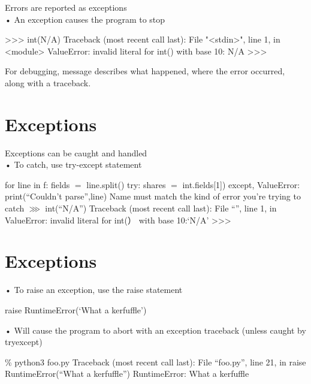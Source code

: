 \documentclass[
  letterpaper,
  DIV=11,
  numbers=noendperiod]{scrreprt}
\newenvironment{Shaded}{\begin{snugshade}}{\end{snugshade}}
\newcommand{\NormalTok}[1]{\textcolor[rgb]{0.00,0.23,0.31}{#1}}
\begin{document}
Errors are reported as exceptions\\
• An exception causes the program to stop

\begin{Shaded}
\begin{Highlighting}[]
\NormalTok{\textgreater{}\textgreater{}\textgreater{} int(\textquotesingle{}N/A\textquotesingle{})}
\NormalTok{Traceback (most recent call last):}
\NormalTok{    File "\textless{}stdin\textgreater{}", line 1, in \textless{}module\textgreater{}}
\NormalTok{ValueError: invalid literal for int() with base 10: \textquotesingle{}N/A\textquotesingle{}}
\NormalTok{\textgreater{}\textgreater{}\textgreater{} }
\end{Highlighting}
\end{Shaded}

For debugging, message describes what happened, where the error
occurred, along with a traceback.


\chapter{Exceptions}\label{exceptions}

Exceptions can be caught and handled\\
• To catch, use try-except statement

for line in f: fields \(=\) line.split() try: shares \(=\)
int.fields{[}1{]}) except, ValueError: print(``Couldn't parse'',line)
Name must match the kind of error you're trying to catch \(\ggg\)
int(``N/A'') Traceback (most recent call last): File ``'', line 1, in
ValueError: invalid literal for int(） with base 10:`N/A'
\textgreater\textgreater\textgreater{}


\chapter{Exceptions}\label{exceptions-1}

• To raise an exception, use the raise statement

raise RuntimeError(`What a kerfuffle')

• Will cause the program to abort with an exception traceback (unless
caught by tryexcept)

\% python3 foo.py Traceback (most recent call last): File ``foo.py'',
line 21, in raise RuntimeError(``What a kerfuffle'') RuntimeError: What
a kerfuffle
\end{document}
